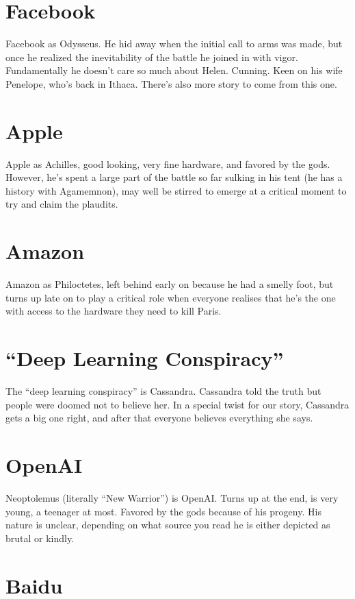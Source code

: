 \documentclass[a4paper]{caesar_book}
\begin{document}
\section{Facebook}

Facebook as Odysseus. He hid away when the initial call to arms was made, but once he realized the inevitability of the battle he joined in with vigor. Fundamentally he doesn't care so much about Helen. Cunning. Keen on his wife Penelope, who’s back in Ithaca. There’s also more story to come from this one.

\section{Apple}

Apple as Achilles, good looking, very fine hardware, and favored by the gods. However, he’s spent a large part of the battle so far sulking in his tent (he has a history with Agamemnon), may well be stirred to emerge at a critical moment to try and claim the plaudits.

\section{Amazon}

Amazon as Philoctetes, left behind early on because he had a smelly foot, but turns up late on to play a critical role when everyone realises that he’s the one with access to the hardware they need to kill Paris.

\section{``Deep Learning Conspiracy''}

The “deep learning conspiracy” is Cassandra. Cassandra told the truth but people were doomed not to believe her. In a special twist for our story, Cassandra gets a big one right, and after that everyone believes everything she says.

\section{OpenAI}

Neoptolemus (literally ``New Warrior'') is OpenAI. Turns up at the end, is very young, a teenager at most. Favored by the gods because of his progeny. His nature is unclear, depending on what source you read he is either depicted as brutal or kindly.

\section{Baidu}
\end{document}

